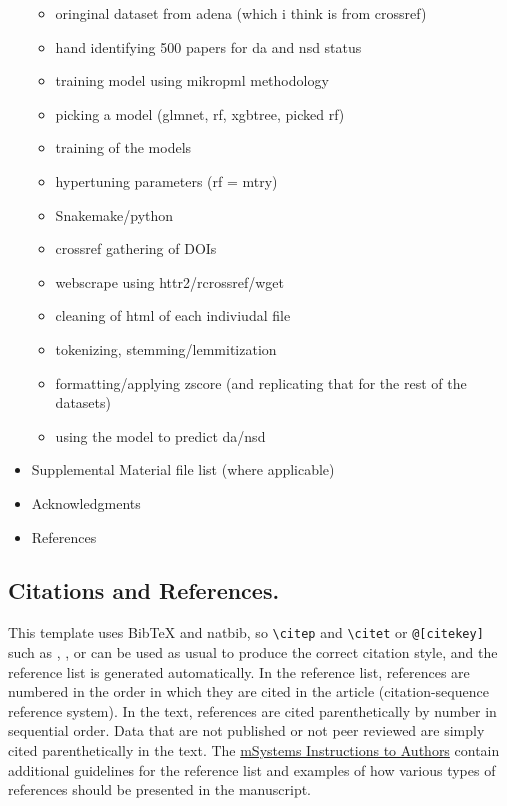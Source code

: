 \documentclass[
  lineno]{asm}
\providecommand{\tightlist}{%
  \setlength{\itemsep}{0pt}\setlength{\parskip}{0pt}}\usepackage{longtable,booktabs,array}
\begin{document}
\begin{itemize}
  \begin{itemize}
  \tightlist
  \item
    oringinal dataset from adena (which i think is from crossref)
  \item
    hand identifying 500 papers for da and nsd status
  \item
    training model using mikropml methodology
  \item
    picking a model (glmnet, rf, xgbtree, picked rf)
  \item
    training of the models
  \item
    hypertuning parameters (rf = mtry)
  \item
    Snakemake/python
  \item
    crossref gathering of DOIs
  \item
    webscrape using httr2/rcrossref/wget
  \item
    cleaning of html of each indiviudal file
  \item
    tokenizing, stemming/lemmitization
  \item
    formatting/applying zscore (and replicating that for the rest of the
    datasets)
  \item
    using the model to predict da/nsd
  \end{itemize}
\item
  Supplemental Material file list (where applicable)
\item
  Acknowledgments
\item
  References
\end{itemize}

\subsection{Citations and References.}\label{citations-and-references.}

This template uses BibTeX and natbib, so \verb|\citep| and \verb|\citet|
or \texttt{@{[}citekey{]}} such as \citep{caserta:etal:2012},
\citet{johnson:robinson:2016}, or \citep{winnick:etal:2005} can be used
as usual to produce the correct citation style, and the reference list
is generated automatically. In the reference list, references are
numbered in the order in which they are cited in the article
(citation-sequence reference system). In the text, references are cited
parenthetically by number in sequential order. Data that are not
published or not peer reviewed are simply cited parenthetically in the
text. The
\href{https://journals.asm.org/journal/msystems/article-types}{mSystems
Instructions to Authors} contain additional guidelines for the reference
list and examples of how various types of references should be presented
in the manuscript.
\end{document}
